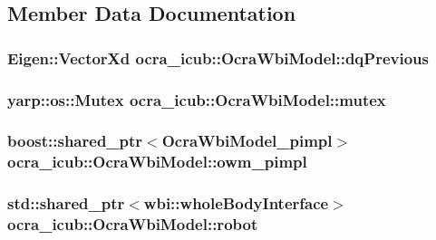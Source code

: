 \subsection{\-Member \-Data \-Documentation}
\hypertarget{classocra__icub_1_1OcraWbiModel_a81cbe15f478202b6327343395e10637b}{
\subsubsection[{dq\-Previous}]{\setlength{\rightskip}{0pt plus 5cm}\-Eigen\-::\-Vector\-Xd {\bf ocra\-\_\-icub\-::\-Ocra\-Wbi\-Model\-::dq\-Previous}}}\label{classocra__icub_1_1OcraWbiModel_a81cbe15f478202b6327343395e10637b}
\hypertarget{classocra__icub_1_1OcraWbiModel_ae843ccb96192d22e61438ecd1bb0e29d}{
\subsubsection[{mutex}]{\setlength{\rightskip}{0pt plus 5cm}yarp\-::os\-::\-Mutex {\bf ocra\-\_\-icub\-::\-Ocra\-Wbi\-Model\-::mutex}}}\label{classocra__icub_1_1OcraWbiModel_ae843ccb96192d22e61438ecd1bb0e29d}
\hypertarget{classocra__icub_1_1OcraWbiModel_ab649cb769ca4edd345b3c09c43a69bde}{
\subsubsection[{owm\-\_\-pimpl}]{\setlength{\rightskip}{0pt plus 5cm}boost\-::shared\-\_\-ptr$<${\bf \-Ocra\-Wbi\-Model\-\_\-pimpl}$>$ {\bf ocra\-\_\-icub\-::\-Ocra\-Wbi\-Model\-::owm\-\_\-pimpl}}}\label{classocra__icub_1_1OcraWbiModel_ab649cb769ca4edd345b3c09c43a69bde}
\hypertarget{classocra__icub_1_1OcraWbiModel_ae377f000580656227fa9ef69f2f2e71d}{
\subsubsection[{robot}]{\setlength{\rightskip}{0pt plus 5cm}std\-::shared\-\_\-ptr$<$wbi\-::whole\-Body\-Interface$>$ {\bf ocra\-\_\-icub\-::\-Ocra\-Wbi\-Model\-::robot}}}\label{classocra__icub_1_1OcraWbiModel_ae377f000580656227fa9ef69f2f2e71d}
